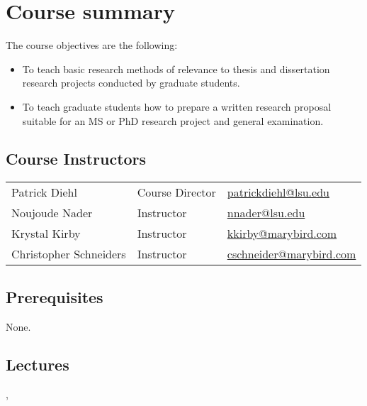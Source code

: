\documentclass[11pt,letterpaper]{article}
\begin{document}
\section*{Course summary}
The course objectives are the following:
\begin{itemize}
\item To teach basic research methods of relevance to thesis and dissertation research projects
conducted by graduate students.
\item To teach graduate students how to prepare a written research proposal suitable for an MS or
PhD research project and general examination.
\end{itemize}



\subsection*{Course Instructors}
\begin{tabular}{lll}
Patrick Diehl & Course Director & \url{patrickdiehl@lsu.edu} \\ 
Noujoude Nader & Instructor & \url{nnader@lsu.edu} \\ 
Krystal Kirby & Instructor & \url{kkirby@marybird.com} \\
Christopher Schneiders & Instructor &  \url{cschneider@marybird.com}
\end{tabular} 

\subsection*{Prerequisites}
None.

\subsection*{Lectures}
\coursedate, \courselocation
\end{document}
